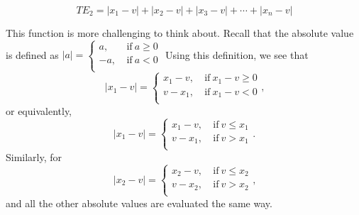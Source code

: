 \documentclass[10pt,]{book}
\theoremstyle{ptxdefinitionnotitle}
\theoremstyle{ptxdefinitiontitle}
\numberwithin{equation}{section}
\newcommand{\lt}{<}
\newcommand{\gt}{>}
\newcommand{\amp}{&}
\begin{document}
\begin{example}[{.}]
\begin{equation*}
T{E_2} = \left| {{x_1} - v} \right| + \left| {{x_2} - v} \right| + \left| {{x_3} - v} \right| +  \cdots  + \left| {{x_n} - v} \right|
\end{equation*}
%
\par
\hypertarget{p-64}{}%
This function is more challenging to think about. Recall that the absolute value is defined as \(\left | a \right | =
\begin{cases}
a, \amp  \ \text{if}  \ a \geq 0 \\
-a, \amp  \ \text{if}  \ a \lt 0 \\
\end{cases}\) Using this definition, we see that%
\begin{equation*}
\left | {{x_1} - v} \right | =
\begin{cases}
x_1 - v, \amp  \ \text{if}  \ x_1 - v \geq 0 \\
v - x_1, \amp  \ \text{if}  \ x_1 - v \lt 0 \\
\end{cases}\text{,}
\end{equation*}
or equivalently,%
\begin{equation*}
\left | {{x_1} - v} \right | =
\begin{cases}
x_1 - v, \amp  \ \text{if}  \ v \leq x_1 \\
v - x_1, \amp  \ \text{if}  \ v \gt  x_1 \\
\end{cases}\text{.}
\end{equation*}
Similarly, for%
\begin{equation*}
\left | {{x_2} - v} \right | =
\begin{cases}
x_2 - v, \amp  \ \text{if}  \ v \leq x_2 \\
v - x_2, \amp  \ \text{if}  \ v \gt  x_2 \\
\end{cases}\text{,}
\end{equation*}
and all the other absolute values are evaluated the same way. \\%
\par
\hypertarget{p-65}{}%

\end{example}
\end{document}
